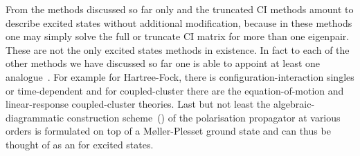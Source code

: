 From the methods discussed so far only \FCI and the truncated CI methods
amount to describe excited states without additional modification,
because in these methods one may simply solve the full or truncate CI matrix
for more than one eigenpair.
These are not the only excited states methods in existence.
In fact to each of the other methods we have discussed
so far one is able to appoint at least one analogue~\cite{Dreuw2005}.
For example for Hartree-Fock, there is configuration-interaction singles
or time-dependent \HF and
for coupled-cluster there are the equation-of-motion and linear-response coupled-cluster theories.
Last but not least the algebraic-diagrammatic construction scheme~(\ADC)
of the polarisation propagator at various orders is formulated
on top of a Møller-Plesset ground state
and can thus be thought of as an \MP for excited states.
